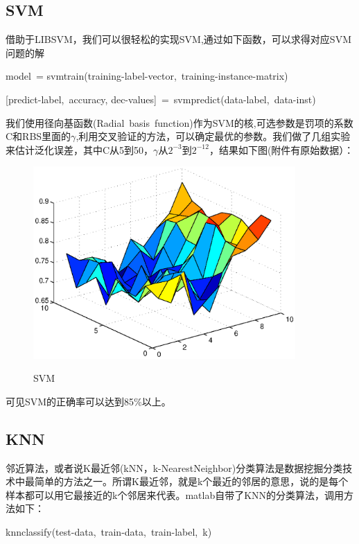 \documentclass[12pt]{elsarticle}
\begin{document}
\subsection{SVM}
借助于LIBSVM，我们可以很轻松的实现SVM,通过如下函数，可以求得对应SVM问题的解

model\ = svmtrain(training-label-vector,\ training-instance-matrix)

[predict-label,\ accuracy, dec-values]\ =\ svmpredict(data-label,\ data-inst)

我们使用径向基函数(Radial\ basis\ function)作为SVM的核,可选参数是罚项的系数C和RBS里面的$\gamma$,利用交叉验证的方法，可以确定最优的参数。我们做了几组实验来估计泛化误差，其中C从5到50，$\gamma$从$2^{-3}$到$2^{-12}$，结果如下图(附件有原始数据）：
\begin{figure}[!ht]
  \centering
  \includegraphics[width=10cm]{svm}\\
  \caption{SVM}\label{fig:delay}
\end{figure}
可见SVM的正确率可以达到85$\%$以上。
\subsection{KNN}
邻近算法，或者说K最近邻(kNN，k-NearestNeighbor)分类算法是数据挖掘分类技术中最简单的方法之一。所谓K最近邻，就是k个最近的邻居的意思，说的是每个样本都可以用它最接近的k个邻居来代表。matlab自带了KNN的分类算法，调用方法如下：

knnclassify(test-data,\ train-data,\ train-label,\ k)
\end{document}
